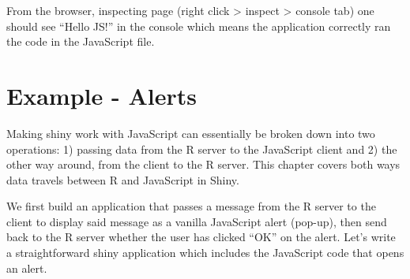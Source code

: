 \documentclass[
]{krantz}
\makeatletter
\newenvironment{Shaded}{\begin{snugshade}}{\end{snugshade}}
\newcommand{\CommentTok}[1]{\textcolor[rgb]{0.37,0.37,0.37}{\textit{#1}}}
\newcommand{\ControlFlowTok}[1]{\textcolor[rgb]{0.27,0.27,0.27}{\textbf{#1}}}
\newcommand{\DataTypeTok}[1]{\textcolor[rgb]{0.27,0.27,0.27}{#1}}
\newcommand{\KeywordTok}[1]{\textcolor[rgb]{0.27,0.27,0.27}{\textbf{#1}}}
\newcommand{\NormalTok}[1]{#1}
\newcommand{\OperatorTok}[1]{\textcolor[rgb]{0.43,0.43,0.43}{\textbf{#1}}}
\newcommand{\StringTok}[1]{\textcolor[rgb]{0.5,0.5,0.5}{#1}}
\newenvironment{kframe}{%
\medskip{}
\setlength{\fboxsep}{.8em}
 \def\at@end@of@kframe{}%
 \ifinner\ifhmode%
  \def\at@end@of@kframe{\end{minipage}}%
  \begin{minipage}{\columnwidth}%
 \fi\fi%
 \def\FrameCommand##1{\hskip\@totalleftmargin \hskip-\fboxsep
 \colorbox{shadecolor}{##1}\hskip-\fboxsep
     \hskip-\linewidth \hskip-\@totalleftmargin \hskip\columnwidth}%
 \MakeFramed {\advance\hsize-\width
   \@totalleftmargin\z@ \linewidth\hsize
   \@setminipage}}%
 {\par\unskip\endMakeFramed%
 \at@end@of@kframe}
\renewenvironment{Shaded}{\begin{kframe}}{\end{kframe}}
\makeatother
\begin{document}
\begin{Shaded}
\end{Shaded}

From the browser, inspecting page (right click \textgreater{} inspect \textgreater{} console tab) one should see ``Hello JS!'' in the console which means the application correctly ran the code in the JavaScript file.

\hypertarget{example---alerts}{%
\section{Example - Alerts}\label{example---alerts}}

Making shiny work with JavaScript can essentially be broken down into two operations: 1) passing data from the R server to the JavaScript client and 2) the other way around, from the client to the R server. This chapter covers both ways data travels between R and JavaScript in Shiny.

We first build an application that passes a message from the R server to the client to display said message as a vanilla JavaScript alert (pop-up), then send back to the R server whether the user has clicked ``OK'' on the alert. Let's write a straightforward shiny application which includes the JavaScript code that opens an alert.

\begin{Shaded}
\end{Shaded}
\end{document}
